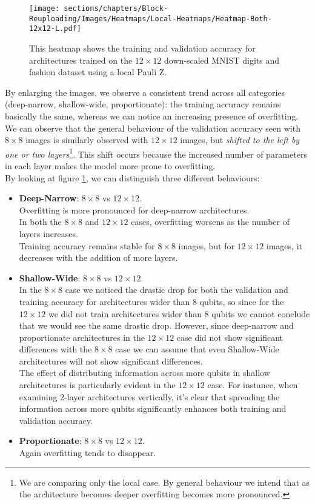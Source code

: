 \begin{figure}[h]
    \centering
    \texttt{[image: sections/chapters/Block-Reuploading/Images/Heatmaps/Local-Heatmaps/Heatmap-Both-12x12-L.pdf]}
    \caption{This heatmap shows the training and validation accuracy for architectures 
    trained on the $12\times12$ down-scaled MNIST digits and fashion dataset using a local Pauli Z.}
    \label{fig:heatmap-12x12-L}
\end{figure}

By enlarging the images, we observe a consistent trend across all categories 
(deep-narrow, shallow-wide, proportionate): the training accuracy remains basically the same, whereas we 
can notice an increasing presence of overfitting.
We can observe that the general behaviour of the validation accuracy seen with $8\times8$ images is 
similarly observed with $12\times12$ images, but \textit{shifted to the left by one or two layers}\footnote[1]{We are comparing only the local case. 
By general behaviour we intend that as the architecture becomes deeper overfitting becomes more 
pronounced.}. This shift 
occurs because the increased number of parameters in each layer makes the model more prone to overfitting.\\

By looking at figure \ref{fig:heatmap-12x12-L}, we can distinguish 
three different behaviours:

\begin{itemize}
    \item \textbf{Deep-Narrow}: $8\times8$ vs $12\times12$.\\
    Overfitting is more pronounced for deep-narrow architectures.\\
    In both the $8\times8$ and $12\times12$ cases, overfitting worsens as the number of layers increases. \\
    Training accuracy remains stable for $8\times8$ images, but for $12\times12$ images, 
    it decreases with the addition of more layers.
    \item \textbf{Shallow-Wide}: $8\times8$ vs $12\times12$.\\
    In the $8\times8$ case we noticed the drastic drop for both the validation and training accuracy for 
    architectures wider than 8 qubits, so since for the $12\times12$ we did not train architectures wider than 
    8 qubits we cannot conclude that we would see the same drastic drop.
    However, since deep-narrow and proportionate architectures in the $12\times12$ case did not show 
    significant differences with the $8\times8$ case we can assume that even Shallow-Wide architectures will
    not show significant differences.\\
    The effect of distributing information across more qubits in shallow architectures is particularly 
    evident in the $12\times12$ case. For instance, when examining 2-layer architectures vertically, 
    it's clear that spreading the information across more qubits significantly enhances both training and 
    validation accuracy.
    \item \textbf{Proportionate}: $8\times8$ vs $12\times12$.\\
    Again overfitting tends to disappear. \\
 \end{itemize}